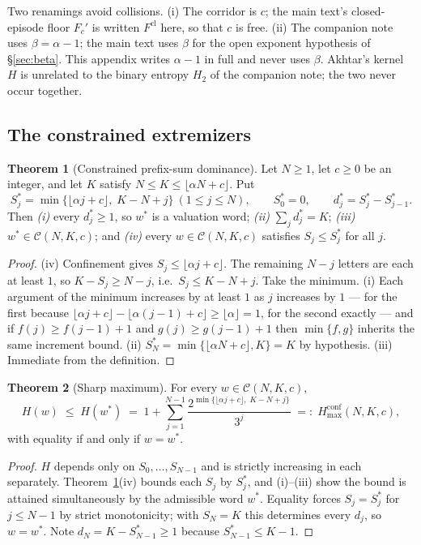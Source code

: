 \documentclass[11pt,a4paper]{article}
\theoremstyle{plain}
\theoremstyle{definition}
\newcommand{\Fc}{F_{c}}
\newcommand{\Fcl}{F^{\mathrm{cl}}}
\newcommand{\Cc}{\mathcal{C}}
\newtheorem{thmE}{Theorem}[section]
\newcommand{\al}{\alpha}
\begin{document}
Two renamings avoid collisions. (i) The corridor is $c$; the main text's
closed-episode floor $\Fc'$ is written $\Fcl$ here, so that $c$ is free.
(ii) The companion note uses $\beta=\al-1$; the main text uses $\beta$ for the
open exponent hypothesis of \S\ref{sec:beta}. This appendix writes $\al-1$ in
full and never uses $\beta$. Akhtar's kernel $H$ is unrelated to the binary
entropy $H_2$ of the companion note; the two never occur together.

\subsection{The constrained extremizers}

\begin{thmE}[Constrained prefix-sum dominance]\label{thm:E1}
Let $N\ge1$, let $c\ge0$ be an integer, and let $K$ satisfy
$N\le K\le\lfloor \al N+c\rfloor$. Put
\[
S^{*}_j=\min\bigl\{\lfloor \al j+c\rfloor,\;K-N+j\bigr\}\ (1\le j\le N),
\qquad S^{*}_0=0,\qquad d^{*}_j=S^{*}_j-S^{*}_{j-1}.
\]
Then \emph{(i)} every $d^{*}_j\ge1$, so $w^{*}$ is a valuation word;
\emph{(ii)} $\sum_j d^{*}_j=K$; \emph{(iii)} $w^{*}\in\Cc(N,K,c)$; and
\emph{(iv)} every $w\in\Cc(N,K,c)$ satisfies $S_j\le S^{*}_j$ for all $j$.
\end{thmE}

\begin{proof}
(iv) Confinement gives $S_j\le\lfloor \al j+c\rfloor$. The remaining $N-j$
letters are each at least $1$, so $K-S_j\ge N-j$, i.e.\ $S_j\le K-N+j$. Take
the minimum. (i) Each argument of the minimum increases by at least $1$ as $j$
increases by $1$ --- for the first because $\lfloor \al j+c\rfloor-
\lfloor \al(j-1)+c\rfloor\ge\lfloor \al\rfloor=1$, for the second exactly ---
and if $f(j)\ge f(j-1)+1$ and $g(j)\ge g(j-1)+1$ then
$\min\{f,g\}$ inherits the same increment bound. (ii)
$S^{*}_N=\min\{\lfloor \al N+c\rfloor,K\}=K$ by hypothesis. (iii) Immediate
from the definition.
\end{proof}

\begin{thmE}[Sharp maximum]\label{thm:E2}
For every $w\in\Cc(N,K,c)$,
\[
H(w)\;\le\;H(w^{*})\;=\;1+\sum_{j=1}^{N-1}
\frac{2^{\min\{\lfloor \al j+c\rfloor,\;K-N+j\}}}{3^{j}}
\;=:\;H^{\mathrm{conf}}_{\max}(N,K,c),
\]
with equality if and only if $w=w^{*}$.
\end{thmE}

\begin{proof}
$H$ depends only on $S_0,\dots,S_{N-1}$ and is strictly increasing in each
separately. Theorem~\ref{thm:E1}(iv) bounds each $S_j$ by $S^{*}_j$, and
(i)--(iii) show the bound is attained simultaneously by the admissible word
$w^{*}$. Equality forces $S_j=S^{*}_j$ for $j\le N-1$ by strict monotonicity;
with $S_N=K$ this determines every $d_j$, so $w=w^{*}$. Note $d_N=K-S^{*}_{N-1}
\ge1$ because $S^{*}_{N-1}\le K-1$.
\end{proof}
\end{document}
